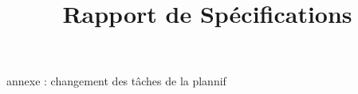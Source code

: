\documentclass{rapport}
\title{Rapport de Spécifications}
\begin{document}
    
    \tableofcontents
  
  		
  	
  	
  	
	
	
	
  	
  	annexe : changement des tâches de la plannif
\end{document}
